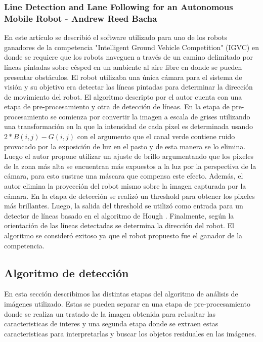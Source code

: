 	\subsubsection{Line Detection and Lane Following for an Autonomous Mobile Robot - Andrew Reed Bacha}
	En este artículo se describió el software utilizado para uno de los robots ganadores de la competencia "Intelligent Ground Vehicle Competition" (IGVC) en donde se requiere que los robots naveguen  a través de un camino delimitado por líneas pintadas sobre césped en un ambiente al aire libre en donde se pueden presentar obstáculos. El robot utilizaba una única cámara para el sistema de visión y su objetivo era detectar las líneas pintadas 
para determinar la dirección de movimiento del robot. El algoritmo 
descripto por el autor cuenta con una etapa de pre-procesamiento y otra 
de detección de líneas. En la etapa de pre-procesamiento se comienza 
por convertir la imagen a escala de grises utilizando una 
transformación en la que la intensidad de cada pixel es determinada 
usando $2*B(i,j) - G(i,j)$ con el argumento que el canal verde contiene 
ruido provocado por la exposición de luz en el pasto y de esta manera 
se lo elimina. Luego el autor propone utilizar un ajuste de brillo 
argumentando que los pixeles de la zona más alta se encuentran más 
expuestos a la luz por la perspectiva de la cámara, para esto sustrae 
una máscara que compensa este efecto. Además, el autor elimina la 
proyección del robot mismo sobre la imagen capturada por la cámara. 
En la etapa de detección se realizó un threshold para obtener los 
pixeles más brillantes. Luego, la salida del threshold se utilizó 
como entrada para un detector de líneas basado en el algoritmo de 
Hough \cite{hough62}. Finalmente, según la orientación de las líneas detectadas se determina la dirección del robot. El algoritmo se consideró exitoso ya que el robot propuesto fue el ganador de la competencia.
\pagebreak

	
\subsection{Algoritmo de detección}
En esta sección describimos las distintas etapas del algoritmo de análisis 
de imágenes utilizado. Estas se pueden separar en una etapa de 
pre-procesamiento donde se realiza un tratado de la imagen obtenida 
para re1saltar las caracteristicas de interes y  una segunda etapa donde se 
extraen estas caracteristicas para interpretarlas y  buscar 
los objetos residuales en las imágenes.


